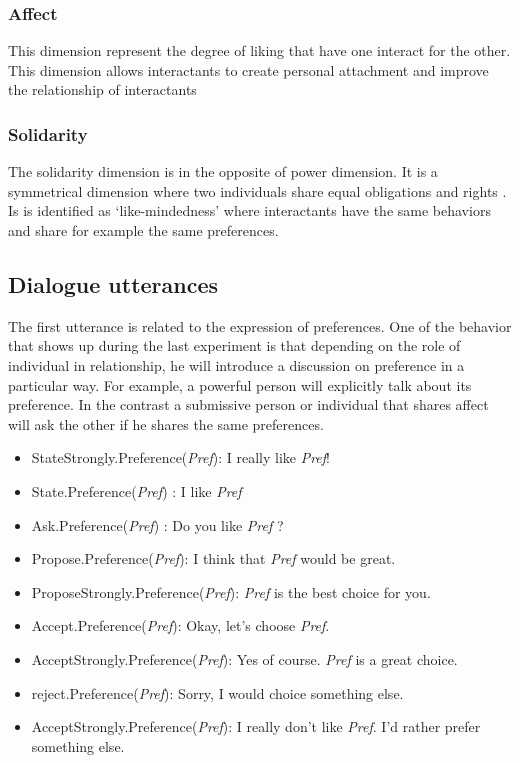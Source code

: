\documentclass{llncs}
\begin{document}
\subsubsection{Affect}
This dimension represent the degree of liking that have one interact for the other. This dimension allows interactants to create personal attachment and improve the relationship of interactants \cite{nicholson2001role}
\subsubsection{Solidarity}
The solidarity dimension is in the opposite of power dimension. It is a symmetrical dimension where two individuals share equal obligations and rights \cite{svennevig2000getting}. Is is identified as ‘like-mindedness’ \cite{bickmore2005establishing} where interactants have the same behaviors and share for example the same preferences.
\subsection{Dialogue utterances}
\par The first utterance is related to the expression of preferences. One of the behavior that shows up during the last experiment is that depending on the role of individual in relationship, he will introduce a discussion on preference in a particular way. For example, a powerful person will explicitly 
talk about its preference. In the contrast a submissive person or individual that shares affect will ask the other if he shares the same preferences. 
 \begin{itemize}
 \item StateStrongly.Preference(\textit{Pref}): I really like \textit{Pref}!
 \item State.Preference(\textit{Pref}) : I like \textit{Pref} 
 \item Ask.Preference(\textit{Pref}) : Do you like \textit{Pref} ?
 \item Propose.Preference(\textit{Pref}): I think that \textit{Pref} would be great.
 \item ProposeStrongly.Preference(\textit{Pref}): \textit{Pref} is the best choice for you.
 \item Accept.Preference(\textit{Pref}): Okay, let's choose \textit{Pref}.
 \item AcceptStrongly.Preference(\textit{Pref}): Yes of course. \textit{Pref} is a great choice.
 \item reject.Preference(\textit{Pref}): Sorry, I would choice something else.
 \item AcceptStrongly.Preference(\textit{Pref}): I really don't like \textit{Pref}. I'd rather prefer something else.
 \end{itemize} 
\noindent 
\vskip 4pt


\end{document}
